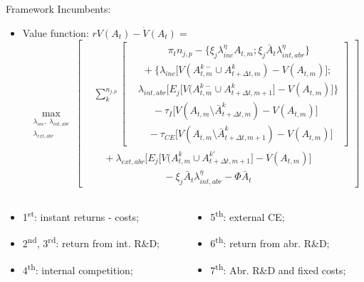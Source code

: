 \documentclass[11pt]{beamer}
\begin{document}
\begin{frame}{Framework}
Incumbents:
	\begin{itemize}
	\item Value function: $rV(A_t) - \dot{V}(A_t) =$\vspace{-3mm} $$ \max_{\substack{\lambda_{inc},\:\lambda_{int, abr}\\\lambda_{ext, abr}}}\left[\begin{aligned}
		&\sum_k^{n_{j, p}}\left[\begin{aligned}
			&\qquad\quad\pi_t n_{j, p} - \{\xi_j\lambda_{inc}^{\eta}A_{t,m};\xi_j\bar{A}_t\lambda_{int, abr}^{\eta}\}\\
			&\ \ + \{\lambda_{inc}\big[V(A_{t,m}^{k-}\cup A_{t+\Delta t,m}^{k}) - V(A_{t,m})\big];\\
			& \lambda_{int, abr}\big[E_j\big[V(A_{t,m}^{k-}\cup A_{t+\Delta t,m+1}^{k}\big] - V(A_{t,m})\big]\}\\
			&\quad\ \ - \tau_I\big[V(A_{t,m}\setminus \bar{A}_{t+\Delta t,m}^{k}) - V(A_{t,m})\big]\\
			&\quad- \tau_{CE}\big[V(A_{t,m}\setminus\bar{A}_{t+\Delta t,m+1}^{k}) - V(A_{t,m})\big]
		\end{aligned}\right]\\
		&\quad+ \lambda_{ext, abr}\big[E_j\big[V(A_{t,m}^{k}\cup A_{t+\Delta t,m+1}^{k'}\big] - V(A_{t,m})\big]\\
		&\qquad\qquad\qquad\quad- \xi_j\bar{A}_t\lambda_{int, abr}^{\eta} - \Phi\bar{A}_t
	\end{aligned}\right]$$
	\end{itemize}
	\vspace{-3mm}
	\begin{columns}
	\begin{column}{0.5\textwidth}
	\begin{itemize}\itemsep3pt	
   	\item 1\textsuperscript{st}: instant returns - costs;
	\item 2\textsuperscript{nd}, 3\textsuperscript{rd}: return from int. R\&D;
	\item 4\textsuperscript{th}: internal competition;
	\end{itemize}
	\end{column}
	\begin{column}{0.5\textwidth}
	\begin{itemize}\itemsep3pt	
	\item 5\textsuperscript{th}: external CE;
	\item 6\textsuperscript{th}: return from abr. R\&D;
	\item 7\textsuperscript{th}: Abr. R\&D and fixed costs;
	\end{itemize}    
	\end{column}
	\end{columns}			
\end{frame}
\end{document}

